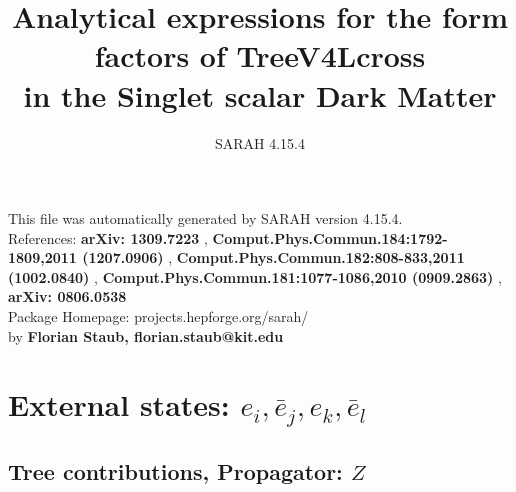 \documentclass[A4,landscape]{article}
\begin{document}
\title{Analytical expressions for the form factors of TreeV4Lcross\\ in the Singlet scalar Dark Matter } 
 \author{SARAH 4.15.4} 
 \maketitle 
 \vspace{10cm} 
This file was automatically generated by SARAH version 4.15.4.  \\ 
References: {\bf arXiv: 1309.7223 }, {\bf Comput.Phys.Commun.184:1792-1809,2011 (1207.0906) }, {\bf Comput.Phys.Commun.182:808-833,2011 (1002.0840) }, {\bf Comput.Phys.Commun.181:1077-1086,2010 (0909.2863) }, {\bf arXiv: 0806.0538 } \\ 
Package Homepage: projects.hepforge.org/sarah/ \\ 
by {\bf Florian Staub, florian.staub@kit.edu} 
 \pagebreak 
 \tableofcontents 
 \pagebreak 
\section{External states: ${e_{{i}}, \bar{e}_{{j}}, e_{{k}}, \bar{e}_{{l}}}$} 
\subsection{Tree contributions, Propagator: $Z$} 
\end{document}
